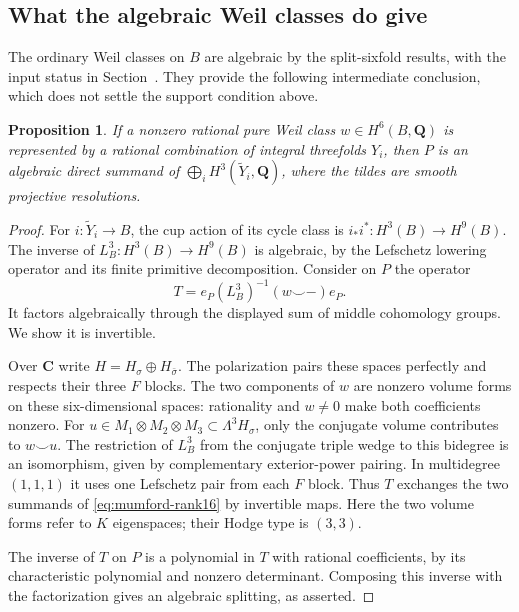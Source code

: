 \documentclass[11pt]{article}
\newtheorem{proposition}[theorem]{Proposition}
\theoremstyle{definition}
\theoremstyle{remark}
\begin{document}
\subsection{What the algebraic Weil classes do give}

The ordinary Weil classes on $B$ are algebraic by the split-sixfold
results, with the input status in Section~.
They provide the following intermediate conclusion, which does not
settle the support condition above.

\begin{proposition}\label{prop:weil-support-middle}
If a nonzero rational pure Weil class $w\in H^6(B,\mathbf Q)$ is
represented by a rational combination of integral threefolds $Y_i$,
then $P$ is an algebraic direct summand of
$\bigoplus_i H^3(\widetilde Y_i,\mathbf Q)$, where the tildes are
smooth projective resolutions.
\end{proposition}

\begin{proof}
For $i:\widetilde Y_i\to B$, the cup action of its cycle class is
$i_*i^*:H^3(B)\to H^9(B)$.
The inverse of $L_B^3:H^3(B)\to H^9(B)$ is algebraic, by the
Lefschetz lowering operator and its finite primitive decomposition.
Consider on $P$ the operator
\[
 T=e_P(L_B^3)^{-1}(w\smile -)e_P.
\]
It factors algebraically through the displayed sum of middle
cohomology groups.  We show it is invertible.

Over $\mathbf C$ write $H=H_\sigma\oplus H_{\bar\sigma}$.
The polarization pairs these spaces perfectly and respects their
three $F$ blocks.  The two components of $w$ are nonzero volume
forms on these six-dimensional spaces: rationality and $w\ne0$
make both coefficients nonzero.  For
$u\in M_1\otimes M_2\otimes M_3\subset\Lambda^3H_\sigma$,
only the conjugate volume contributes to $w\smile u$.
The restriction of $L_B^3$ from the conjugate triple wedge to this
bidegree is an isomorphism, given by complementary exterior-power
pairing.  In multidegree $(1,1,1)$ it uses one Lefschetz pair from
each $F$ block.  Thus $T$ exchanges the two summands of
\eqref{eq:mumford-rank16} by invertible maps.  Here the two volume
forms refer to $K$ eigenspaces; their Hodge type is $(3,3)$.

The inverse of $T$ on $P$ is a polynomial in $T$ with rational
coefficients, by its characteristic polynomial and nonzero
determinant.  Composing this inverse with the factorization gives
an algebraic splitting, as asserted.
\end{proof}
\end{document}
